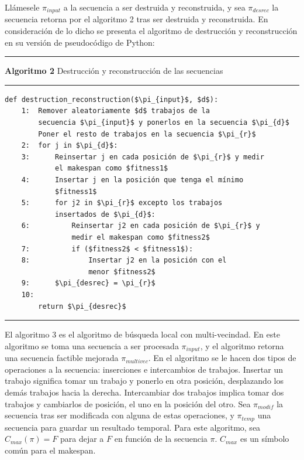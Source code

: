 \documentclass{article}
\begin{document}
\vspace{\baselineskip}
Llámesele $\pi_{input}$ a la secuencia a ser destruida y reconstruida, y sea $\pi_{desrec}$ la secuencia retorna por el algoritmo 2 tras ser destruida y reconstruida. En consideración de lo dicho se presenta el algoritmo de destrucción y reconstrucción en su versión de pseudocódigo de Python:

\noindent\noindent
\rule{\linewidth}{0.4pt}

\textbf{Algoritmo 2} Destrucción y reconstrucción de las secuencias

\noindent\noindent
\rule{\linewidth}{0.4pt}

\begin{lstlisting}[mathescape=true]
    def destruction_reconstruction($\pi_{input}$, $d$):
    1:  Remover aleatoriamente $d$ trabajos de la
        secuencia $\pi_{input}$ y ponerlos en la secuencia $\pi_{d}$
        Poner el resto de trabajos en la secuencia $\pi_{r}$
    2:  for j in $\pi_{d}$:
    3:      Reinsertar j en cada posición de $\pi_{r}$ y medir
            el makespan como $fitness1$
    4:      Insertar j en la posición que tenga el mínimo 
            $fitness1$
    5:      for j2 in $\pi_{r}$ excepto los trabajos
            insertados de $\pi_{d}$:
    6:          Reinsertar j2 en cada posición de $\pi_{r}$ y 
                medir el makespan como $fitness2$
    7:          if ($fitness2$ < $fitness1$):
    8:              Insertar j2 en la posición con el 
                    menor $fitness2$
    9:      $\pi_{desrec} = \pi_{r}$
    10:
        return $\pi_{desrec}$
\end{lstlisting}

\noindent\noindent
\rule{\linewidth}{0.4pt}

\vspace{\baselineskip}
El algoritmo 3 es el algoritmo de búsqueda local con multi-vecindad. En este algoritmo se toma una secuencia a ser procesada $\pi_{input}$, y el algoritmo retorna una secuencia factible mejorada $\pi_{multivec}$. En el algoritmo se le hacen dos tipos de operaciones a la secuencia: inserciones e intercambios de trabajos. Insertar un trabajo significa tomar un trabajo y ponerlo en otra posición, desplazando los demás trabajos hacia la derecha. Intercambiar dos trabajos implica tomar dos trabajos y cambiarlos de posición, el uno en la posición del otro. Sea $\pi_{modif}$ la secuencia tras ser modificada con alguna de estas operaciones, y $\pi_{temp}$ una secuencia para guardar un resultado temporal. Para este algoritmo, sea $C_{max}(\pi) = F$ para dejar a $F$ en función de la secuencia $\pi$. $C_{max}$ es un símbolo común para el makespan. \autocite{algMNIG}
\end{document}
